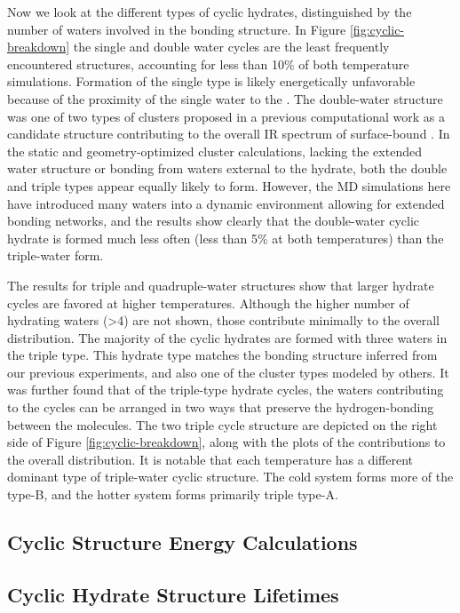 Now we look at the different types of cyclic hydrates, distinguished by the number of waters involved in the bonding structure. In Figure \ref{fig:cyclic-breakdown} the single and double water cycles are the least frequently encountered structures, accounting for less than 10\% of both temperature simulations. Formation of the single type is likely energetically unfavorable because of the proximity of the single water to the \suldiox. The double-water structure was one of two types of clusters proposed in a previous computational work as a candidate structure contributing to the overall IR spectrum of surface-bound \suldiox.\cite{Baer2010} In the static and geometry-optimized cluster calculations, lacking the extended water structure or bonding from waters external to the hydrate, both the double and triple types appear equally likely to form. However, the MD simulations here have introduced many waters into a dynamic environment allowing for extended bonding networks, and the results show clearly that the double-water cyclic hydrate is formed much less often (less than 5\% at both temperatures) than the triple-water form.

The results for triple and quadruple-water structures show that larger hydrate cycles are favored at higher temperatures. Although the higher number of hydrating waters (>4) are not shown, those contribute minimally to the overall distribution. The majority of the cyclic hydrates are formed with three waters in the triple type. This hydrate type matches the bonding structure inferred from our previous experiments, and also one of the cluster types modeled by others.\cite{Tarbuck2005,Tarbuck2006,Baer2010} It was further found that of the triple-type hydrate cycles, the waters contributing to the cycles can be arranged in two ways that preserve the hydrogen-bonding between the molecules. The two triple cycle structure are depicted on the right side of Figure \ref{fig:cyclic-breakdown}, along with the plots of the contributions to the overall distribution. It is notable that each temperature has a different dominant type of triple-water cyclic structure. The cold system forms more of the type-B, and the hotter system forms primarily triple type-A.

\subsection {Cyclic Structure Energy Calculations}

\subsection {Cyclic Hydrate Structure Lifetimes}

